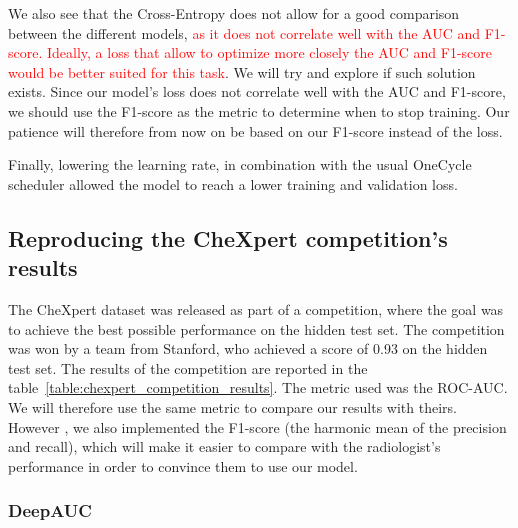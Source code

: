 \documentclass[11pt]{article}
\newcommand\myworries[1]{\textcolor{red}{#1}}
\begin{document}
            We also see that the Cross-Entropy does not allow for a good comparison between the different models, \myworries{as it does not correlate well with the AUC and F1-score.
            Ideally, a loss that allow to optimize more closely the AUC and F1-score would be better suited for this task}. We will try and explore if such solution exists.
            Since our model's loss does not correlate well with the AUC and F1-score, we should use the F1-score as the metric to determine when to stop training. Our patience
            will therefore from now on be based on our F1-score instead of the loss.

            Finally, lowering the learning rate, in combination with the usual OneCycle scheduler allowed the model to reach a lower training and validation loss.


        \subsection{Reproducing the CheXpert competition's results}

            The CheXpert dataset was released as part of a competition, where the goal was to achieve the best possible performance on the hidden test set. The competition was won by a team from Stanford, who achieved a score of 0.93 on the hidden test set. The results of the competition are reported in the table~\ref{table:chexpert_competition_results}.
            The metric used was the ROC-AUC. We will therefore use the same metric to compare our results with theirs. However , we also implemented the
            F1-score (the harmonic mean of the precision and recall), which will make it easier to compare with the radiologist's performance
            in order to convince them to use our model.


        \subsubsection{DeepAUC}
\end{document}
